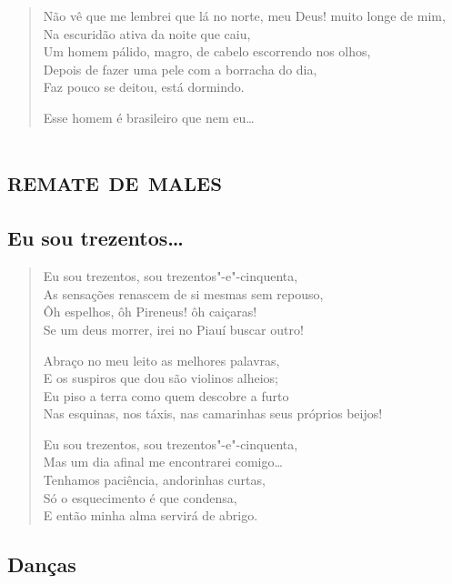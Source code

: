 {\begin{verse}
Não vê que me lembrei que lá no norte, meu Deus! muito longe de mim,\\
Na escuridão ativa da noite que caiu,\\
Um homem pálido, magro, de cabelo escorrendo nos olhos,\\
Depois de fazer uma pele com a borracha do dia,\\
Faz pouco se deitou, está dormindo.

Esse homem é brasileiro que nem eu\ldots{}
\end{verse}

\paginabranca
{}
\part{\textsc{remate de males}}
\removeepigraph


\chapter[Eu sou trezentos\ldots{}]{Eu sou trezentos\ldots{} }

\begin{verse}
Eu sou trezentos, sou trezentos"-e"-cinquenta,\\
As sensações renascem de si mesmas sem repouso,\\
Ôh espelhos, ôh Pireneus! ôh caiçaras!\\
Se um deus morrer, irei no Piauí buscar outro!

Abraço no meu leito as melhores palavras,\\
E os suspiros que dou são violinos alheios;\\
Eu piso a terra como quem descobre a furto\\
Nas esquinas, nos táxis, nas camarinhas seus próprios beijos!

Eu sou trezentos, sou trezentos"-e"-cinquenta,\\
Mas um dia afinal me encontrarei comigo\ldots{}\\
Tenhamos paciência, andorinhas curtas,\\
Só o esquecimento é que condensa,\\
E então minha alma servirá de abrigo.
\end{verse}

\chapter[Danças]{Danças }


}
